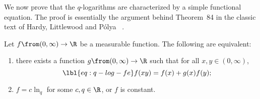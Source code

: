 We now prove that the $q$-logarithms are characterized by a simple
functional equation.  The proof is essentially the argument behind
Theorem~84 in the classic text of Hardy,%
%
%
Littlewood%
%
%
and P\'olya~\cite{HLP}%
%
.

\begin{thm}
% 
% 
Let $f \from (0, \infty) \to \R$ be a measurable function.  The following
are equivalent:
% 
\begin{enumerate}
\item 
{}
there exists a function $g \from (0, \infty) \to \R$ such that for all $x,
y \in (0, \infty)$,
% 
\begin{equation}
\lbl{eq:q-log-fe}
f(xy) = f(x) + g(x) f(y);
\end{equation}

\item
{}
$f = c\ln_q$ for some $c, q \in \R$, or $f$ is constant.
\end{enumerate}
\end{thm}

